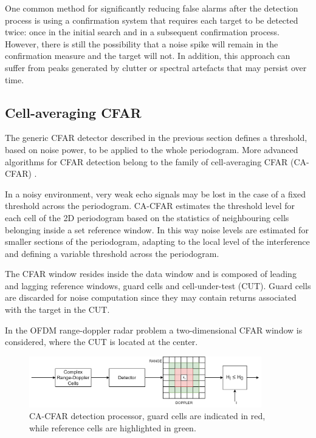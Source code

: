			
			One common method for significantly reducing false alarms after the detection process is using a confirmation system that requires each target to be detected twice: once in the initial search and in a subsequent confirmation process.
			However, there is still the possibility that a noise spike will remain in the confirmation measure and the target will not. In addition, this approach can suffer from peaks generated by clutter or spectral artefacts that may persist over time.

		\subsection{Cell-averaging CFAR}
		\label{sec:cell averaging CFAR}

The generic CFAR detector described in the previous section defines a threshold, based on noise power, to be applied to the whole periodogram. More advanced algorithms for CFAR detection belong to the family of cell-averaging CFAR (CA-CFAR) \cite{Richards_2014}.

In a noisy environment, very weak echo signals may be lost in the case of a fixed threshold across the periodogram. CA-CFAR estimates the threshold level for each cell of the 2D periodogram based on the statistics of neighbouring cells belonging inside a set reference window. In this way noise levels are estimated for smaller sections of the periodogram, adapting to the local level of the interference and defining a variable threshold across the periodogram.

The CFAR window resides inside the data window and is composed of leading and lagging reference windows, guard cells and cell-under-test (CUT). Guard cells are discarded for noise computation since they may contain returns associated with the target in the CUT.

In the OFDM range-doppler radar problem a two-dimensional CFAR window is considered, where the CUT is located at the center.

\begin{figure}[H]
	\centering
	\includegraphics[width=0.9\textwidth]{Images/radar_detect_threshold/cacfar_pipeline.png}
	\caption{CA-CFAR detection processor, guard cells are indicated in red, while reference cells are highlighted in green.}
	\label{fig:cacfar_pipeline}
\end{figure}


